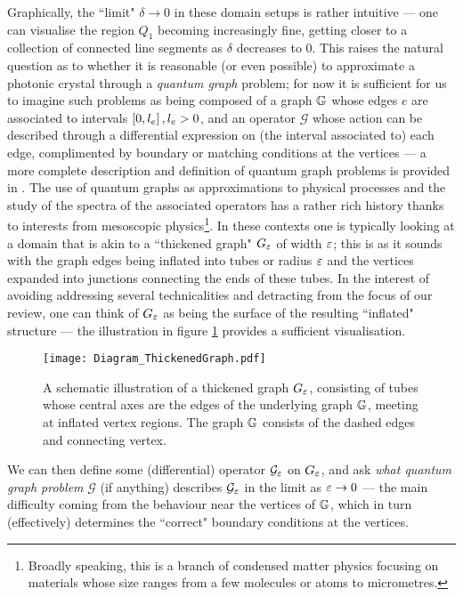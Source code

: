 Graphically, the ``limit" $\delta\rightarrow0$ in these domain setups is rather intuitive --- one can visualise the region $Q_1$ becoming increasingly fine, getting closer to a collection of connected line segments as $\delta$ decreases to 0.
This raises the natural question as to whether it is reasonable (or even possible) to approximate a photonic crystal through a \emph{quantum graph} problem; for now it is sufficient for us to imagine such problems as being composed of a graph $\mathbb{G}$ whose edges $e$ are associated to intervals $\left[ 0,l_{e} \right], l_{e}>0$, and an operator $\mathcal{G}$ whose action can be described through a differential expression on (the interval associated to) each edge, complimented by boundary or matching conditions at the vertices --- a more complete description and definition of quantum graph problems is provided in .
The use of quantum graphs as approximations to physical processes and the study of the spectra of the associated operators has a rather rich history thanks  to interests from mesoscopic physics\footnote{Broadly speaking, this is a branch of condensed matter physics focusing on materials whose size ranges from a few molecules or atoms to micrometres.}.
In these contexts one is typically looking at a domain that is akin to a ``thickened graph" $G_{\varepsilon}$ of width $\varepsilon$; this is as it sounds with the graph edges being inflated into tubes or radius $\varepsilon$ and the vertices expanded into junctions connecting the ends of these tubes.
In the interest of avoiding addressing several technicalities and detracting from the focus of our review, one can think of $G_{\varepsilon}$ as being the surface of the resulting ``inflated" structure --- the illustration in figure \ref{fig:Diagram_ThickenedGraph} provides a sufficient visualisation.
\begin{figure}[b]
	\centering
	\texttt{[image: Diagram\_ThickenedGraph.pdf]}
	\caption{\label{fig:Diagram_ThickenedGraph} A schematic illustration of a thickened graph $G_{\varepsilon}$, consisting of tubes whose central axes are the edges of the underlying graph $\mathbb{G}$, meeting at inflated vertex regions. The graph $\mathbb{G}$ consists of the dashed edges and connecting vertex.}
\end{figure}
We can then define some (differential) operator $\mathcal{G}_{\varepsilon}$ on $G_{\varepsilon}$, and ask \emph{what quantum graph problem} $\mathcal{G}$ (if anything) describes $\mathcal{G}_{\varepsilon}$ in the limit as $\varepsilon\rightarrow0$ --- the main difficulty coming from the behaviour near the vertices of $\mathbb{G}$, which in turn (effectively) determines the ``correct" boundary conditions at the vertices.
